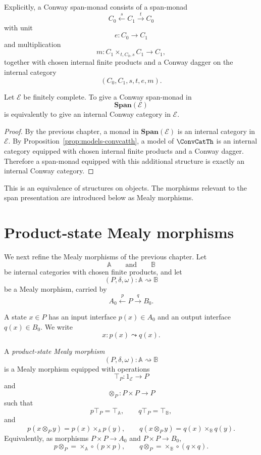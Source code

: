 Explicitly, a Conway span-monad consists of a span-monad
\[
C_0\xleftarrow{s}C_1\xrightarrow{t}C_0
\]
with unit
\[
e:C_0\to C_1
\]
and multiplication
\[
m:C_1\times_{t,C_0,s}C_1\to C_1,
\]
together with chosen internal finite products and a Conway dagger on the
internal category
\[
(C_0,C_1,s,t,e,m).
\]

\begin{theorem}
\label{thm:conway-span-monads-internal-conway-categories}
Let \(\mathcal E\) be finitely complete.  To give a Conway span-monad in
\[
\mathbf{Span}(\mathcal E)
\]
is equivalently to give an internal Conway category in \(\mathcal E\).
\end{theorem}

\begin{proof}
By the previous chapter, a monad in \(\mathbf{Span}(\mathcal E)\) is an
internal category in \(\mathcal E\).  By
Proposition~\ref{prop:models-convcatth}, a model of \(\ConvCatTh\) is an
internal category equipped with chosen internal finite products and a Conway
dagger.  Therefore a span-monad equipped with this additional structure is
exactly an internal Conway category.
\end{proof}

This is an equivalence of structures on objects.  The morphisms relevant to
the span presentation are introduced below as Mealy morphisms.

\section{Product-state Mealy morphisms}
\label{sec:product-state-mealy-morphisms}

We next refine the Mealy morphisms of the previous chapter.  Let
\[
\mathbb A
\qquad\text{and}\qquad
\mathbb B
\]
be internal categories with chosen finite products, and let
\[
(P,\delta,\omega):\mathbb A\rightsquigarrow\mathbb B
\]
be a Mealy morphism, carried by
\[
A_0\xleftarrow{p}P\xrightarrow{q}B_0.
\]

A state \(x\in P\) has an input interface \(p(x)\in A_0\) and an output
interface \(q(x)\in B_0\).  We write
\[
x:p(x)\leadsto q(x).
\]

\begin{definition}
\label{def:product-state-mealy-morphism}
A \emph{product-state Mealy morphism}
\[
(P,\delta,\omega):\mathbb A\rightsquigarrow\mathbb B
\]
is a Mealy morphism equipped with operations
\[
\top_P:1_{\mathcal E}\to P
\]
and
\[
\otimes_P:P\times P\to P
\]
such that
\[
p\top_P=\top_{\mathbb A},
\qquad
q\top_P=\top_{\mathbb B},
\]
and
\[
p(x\otimes_P y)=p(x)\times_{\mathbb A}p(y),
\qquad
q(x\otimes_P y)=q(x)\times_{\mathbb B}q(y).
\]
Equivalently, as morphisms \(P\times P\to A_0\) and \(P\times P\to B_0\),
\[
p\otimes_P
=
\times_{\mathbb A}\circ(p\times p),
\qquad
q\otimes_P
=
\times_{\mathbb B}\circ(q\times q).
\]
\end{definition}

